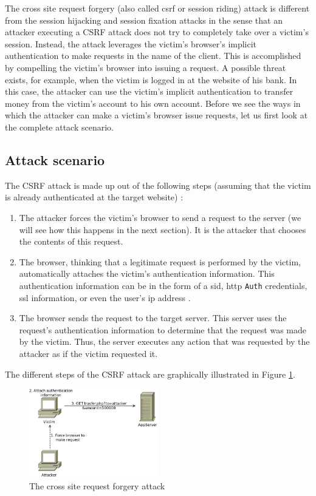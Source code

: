 The cross site request forgery (also called \gls{csrf} or session riding) attack is different from the \gls{session hijacking} and \gls{session fixation} attacks in the sense that an attacker executing a CSRF attack does not try to completely take over a victim's session. Instead, the attack leverages the victim's browser's implicit authentication to make requests in the name of the client. This is accomplished by compelling the victim's browser into issuing a request. A possible threat exists, for example, when the victim is logged in at the website of his bank. In this case, the attacker can use the victim's implicit authentication to transfer money from the victim's account to his own account. Before we see the ways in which the attacker can make a victim's browser issue requests, let us first look at the complete attack scenario.

\subsection{Attack scenario}

The CSRF attack is made up out of the following steps (assuming that the victim is already authenticated at the target website) \cite{Schreiber2004}:

\begin{enumerate}
	\item The attacker forces the victim's browser to send a request to the server (we will see how this happens in the next section). It is the attacker that chooses the contents of this request.
	\item The browser, thinking that a legitimate request is performed by the victim, automatically attaches the victim's authentication information. This authentication information can be in the form of a \gls{sid}, \gls{http} \texttt{Auth} credentials, \gls{ssl} information, or even the user's \gls{ip} address \cite{Johns2006b,Zeller2008}.
	\item The browser sends the request to the target server. This server uses the request's authentication information to determine that the request was made by the victim. Thus, the server executes any action that was requested by the attacker as if the victim requested it.
\end{enumerate}

The different steps of the CSRF attack are graphically illustrated in Figure \ref{fig:csrf}.

\begin{figure}[htb]
	\centering
	\includegraphics[width=0.50\textwidth]{img/csrf.png}
	\caption{The cross site request forgery attack}
	\label{fig:csrf}
\end{figure}

